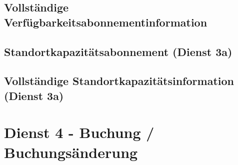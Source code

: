 \subsection*{Vollständige Verfügbarkeitsabonnementinformation}
\label{subsec:Nachrichten:Dienst3:CompleteAvailability}



\medskip




\subsection*{Standortkapazitätsabonnement (Dienst 3a)}
\label{subsec:Nachrichten:Dienst3:PlaceAvailabilitySubscription}





% 

% 



\subsection*{Vollständige Standortkapazitätsinformation (Dienst 3a)}
\label{subsec:Nachrichten:Dienst3:CompletePlaceAvailability}





\section{Dienst 4 - Buchung / Buchungsänderung}
\label{sec:Nachrichten:Dienst4}

